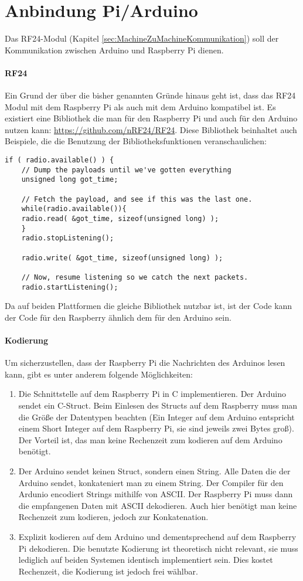 \section{Anbindung Pi/Arduino}
\label{sec:anbindung_raspi_arduino}
Das RF24-Modul (Kapitel \ref{sec:MachineZuMachineKommunikation}) soll der Kommunikation zwischen Arduino und Raspberry Pi dienen. 
\paragraph{RF24}
Ein Grund der über die bisher genannten Gründe hinaus geht ist, dass das RF24 Modul mit dem Raspberry Pi als auch mit dem Arduino kompatibel ist. Es existiert eine Bibliothek die man für den Raspberry Pi und auch für den Arduino nutzen kann: \url{https://github.com/nRF24/RF24}. Diese Bibliothek beinhaltet auch Beispiele, die die Benutzung der Bibliotheksfunktionen veranschaulichen: 
\lstset{language=c}
\begin{lstlisting}
if ( radio.available() ) {
	// Dump the payloads until we've gotten everything
	unsigned long got_time;
	
	// Fetch the payload, and see if this was the last one.
	while(radio.available()){
	radio.read( &got_time, sizeof(unsigned long) );
	}
	radio.stopListening();
				
	radio.write( &got_time, sizeof(unsigned long) );

	// Now, resume listening so we catch the next packets.
	radio.startListening();
\end{lstlisting}

Da auf beiden Plattformen die gleiche Bibliothek nutzbar ist, ist der Code kann der Code für den Raspberry ähnlich dem für den Arduino sein.
\paragraph{Kodierung}
Um sicherzustellen, dass der Raspberry Pi die Nachrichten des Arduinos lesen kann, gibt es unter anderem folgende Möglichkeiten:
\begin{enumerate}
\item Die Schnittstelle auf dem Raspberry Pi in C implementieren. Der Arduino sendet ein C-Struct. Beim Einlesen des Structs auf dem Raspberry muss man die Größe der Datentypen beachten (Ein Integer auf dem Arduino entspricht einem Short Integer auf dem Raspberry Pi, sie sind jeweils zwei Bytes groß). Der Vorteil ist, das man keine Rechenzeit zum kodieren auf dem Arduino benötigt.
\item Der Arduino sendet keinen Struct, sondern einen String. Alle Daten die der Arduino sendet, konkateniert man zu einem String. Der Compiler für den Ardunio encodiert Strings mithilfe von ASCII. Der Raspberry Pi muss dann die empfangenen Daten mit ASCII dekodieren. Auch hier benötigt man keine Rechenzeit zum kodieren, jedoch zur Konkatenation.
\item Explizit kodieren auf dem Arduino und dementsprechend auf dem Raspberry Pi dekodieren. Die benutzte Kodierung ist theoretisch nicht relevant, sie muss lediglich auf beiden Systemen identisch implementiert sein. Dies kostet Rechenzeit, die Kodierung ist jedoch frei wählbar.
\end{enumerate}


